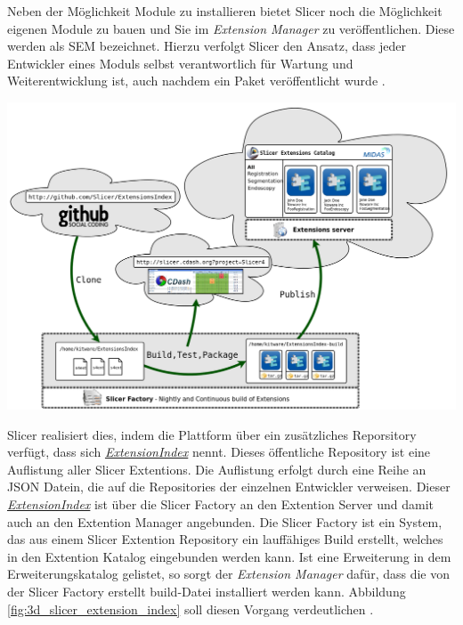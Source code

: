 \begin{minipage}{0.30\textwidth}
	Neben der Möglichkeit Module zu installieren bietet Slicer noch die Möglichkeit
	eigenen Module zu bauen und Sie im \textit{Extension Manager} zu
	veröffentlichen. Diese werden als \ac{SEM} bezeichnet. Hierzu verfolgt Slicer den
	Ansatz, dass jeder Entwickler eines Moduls selbst verantwortlich für Wartung
	und Weiterentwicklung ist, auch nachdem ein Paket veröffentlicht wurde \citep{slicer2024}.
\end{minipage}
\hfill
\begin{minipage}{0.60\textwidth}
	\centering
	\includegraphics[width=1\textwidth]{img/slicer_extention_index.png}
	\label{fig:3d_slicer_extension_index}
\end{minipage}

Slicer realisiert dies, indem die Plattform über ein zusätzliches Reporsitory
verfügt, dass sich \href{https://github.com/Slicer/ExtensionsIndex?tab=readme-ov-file}{\textit{ExtensionIndex}}
nennt. Dieses öffentliche Repository ist eine Auflistung aller Slicer Extentions.
Die Auflistung erfolgt durch eine Reihe an \ac{JSON} Datein, die auf die Repositories
der einzelnen Entwickler verweisen. Dieser
\href{https://github.com/Slicer/ExtensionsIndex?tab=readme-ov-file}{\textit{ExtensionIndex}}
ist über die Slicer Factory an den Extention Server und damit auch an den
Extention Manager angebunden. Die Slicer Factory ist ein System, das aus einem
Slicer Extention Repository ein lauffähiges Build erstellt, welches in den Extention
Katalog eingebunden werden kann. Ist eine Erweiterung in dem Erweiterungskatalog
gelistet, so sorgt der \textit{Extension Manager} dafür, dass die von der Slicer
Factory erstellt build-Datei installiert werden kann. Abbildung
\ref{fig:3d_slicer_extension_index} soll diesen Vorgang verdeutlichen \citep[vgl.][]{slicer2024}.

